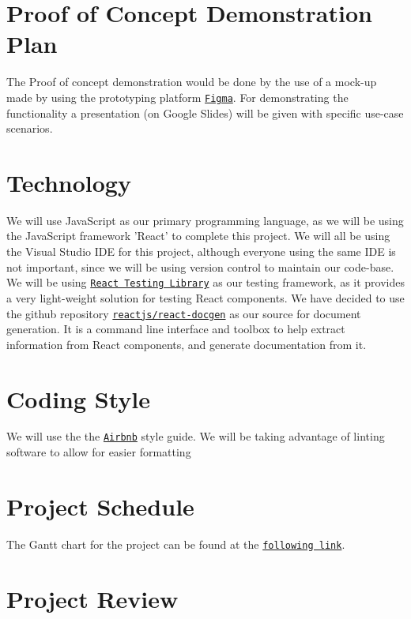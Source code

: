 \documentclass{article}
\begin{document}
\section{Proof of Concept Demonstration Plan}
The Proof of concept demonstration would be done by the use of a mock-up made by using the prototyping platform \texttt{\href{https://www.figma.com/files/recent}{Figma}}. For demonstrating the functionality a presentation (on Google Slides) will be given with specific use-case scenarios.

\section{Technology}
We will use JavaScript as our primary programming language, as we will be using the JavaScript framework 'React' to complete this project. We will all be using the Visual Studio IDE for this project, although everyone using the same IDE is not important, since we will be using version control to maintain our code-base. We will be using \texttt{\href{https://testing-library.com/docs/react-testing-library/intro/}{React Testing Library}} as our testing framework, as it provides a very light-weight solution for testing React components. We have decided to use the github repository \texttt{\href{https://github.com/reactjs/react-docgen}{reactjs/react-docgen}} as our source for document generation. It is a command line interface and toolbox to help extract information from React components, and generate documentation from it.

\section{Coding Style}
We will use the the \href{https://github.com/airbnb/javascript}{\texttt{Airbnb}} style guide. We will be taking advantage of linting software to allow for easier formatting

\section{Project Schedule}

The Gantt chart for the project can be found at the \href{https://gitlab.cas.mcmaster.ca/celsj/3xa3-group2-chess/-/blob/master/Docs/DevelopmentPlan/3XA3ChessProject.gan}{\texttt{following link}}.

\section{Project Review}
\end{document}
